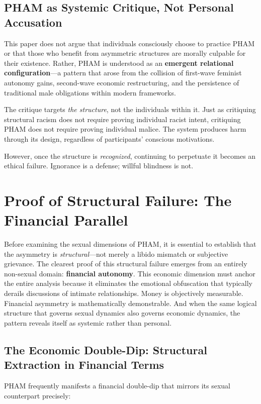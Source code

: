 \documentclass[12pt,openany]{book}
\numberwithin{equation}{chapter}
\begin{document}
\subsection{PHAM as Systemic Critique, Not Personal Accusation}

This paper does not argue that individuals consciously choose to practice PHAM or that those who benefit from asymmetric structures are morally culpable for their existence. Rather, PHAM is understood as an \textbf{emergent relational configuration}---a pattern that arose from the collision of first-wave feminist autonomy gains, second-wave economic restructuring, and the persistence of traditional male obligations within modern frameworks.

The critique targets \textit{the structure}, not the individuals within it. Just as critiquing structural racism does not require proving individual racist intent, critiquing PHAM does not require proving individual malice. The system produces harm through its design, regardless of participants' conscious motivations.

However, once the structure is \textit{recognized}, continuing to perpetuate it becomes an ethical failure. Ignorance is a defense; willful blindness is not.

\section{Proof of Structural Failure: The Financial Parallel}

Before examining the sexual dimensions of PHAM, it is essential to establish that the asymmetry is \textit{structural}---not merely a libido mismatch or subjective grievance. The clearest proof of this structural failure emerges from an entirely non-sexual domain: \textbf{financial autonomy}. This economic dimension must anchor the entire analysis because it eliminates the emotional obfuscation that typically derails discussions of intimate relationships. Money is objectively measurable. Financial asymmetry is mathematically demonstrable. And when the same logical structure that governs sexual dynamics also governs economic dynamics, the pattern reveals itself as systemic rather than personal.

\subsection{The Economic Double-Dip: Structural Extraction in Financial Terms}

PHAM frequently manifests a financial double-dip that mirrors its sexual counterpart precisely:
\end{document}

